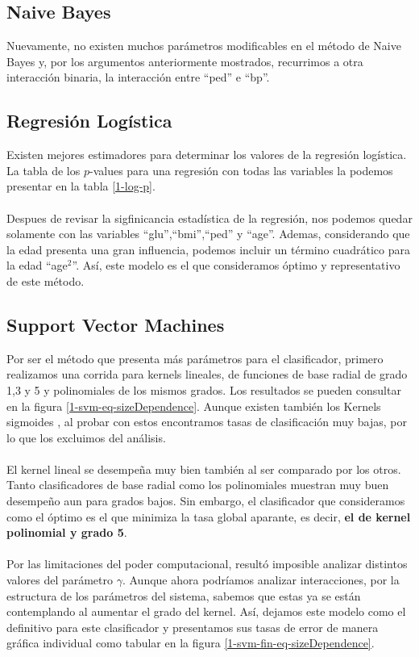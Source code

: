 \documentclass[11pt]{article}
\begin{document}
\subsection{Naive Bayes}
Nuevamente, no existen muchos parámetros modificables en el método de Naive Bayes y, por los argumentos anteriormente mostrados, recurrimos a otra interacción binaria, la interacción entre ``ped'' e ``bp''.
\subsection{Regresión Logística}
Existen mejores estimadores para determinar los valores de la regresión logística. La tabla de los $p$-values para una regresión con todas las variables la podemos presentar en la tabla \ref{1-log-p}.
\\
\\
Despues de revisar la sigfinicancia estadística de la regresión, nos podemos quedar solamente con las variables ``glu'',``bmi'',``ped'' y ``age''. Ademas, considerando que la edad presenta una gran influencia, podemos incluir un término cuadrático para la edad ``age$^2$''. Así, este modelo es el que consideramos óptimo y representativo de este método.
\subsection{Support Vector Machines}
Por ser el método que presenta más parámetros para el clasificador, primero realizamos una corrida para kernels lineales, de funciones de base radial de grado 1,3 y 5 y polinomiales de los mismos grados. Los resultados se pueden consultar en la figura \ref{1-svm-eq-sizeDependence}. Aunque existen también los Kernels sigmoides \cite{sklearn-svc}, al probar con estos encontramos tasas de clasificación muy bajas, por lo que los excluimos del análisis.
\\
\\El kernel lineal se desempeña muy bien también al ser comparado por los otros. Tanto clasificadores de base radial como los polinomiales muestran muy buen desempeño aun para grados bajos. Sin embargo, el clasificador que consideramos como el óptimo es el que minimiza la tasa global aparante, es decir, \textbf{el de kernel polinomial y grado 5}.
\\
\\Por las limitaciones del poder computacional, resultó imposible analizar distintos valores del parámetro $\gamma$. Aunque ahora podríamos analizar interacciones, por la estructura de los parámetros del sistema, sabemos que estas ya se están contemplando al aumentar el grado del kernel. Así, dejamos este modelo como el definitivo para este clasificador y presentamos sus tasas de error de manera gráfica individual como tabular en la figura \ref{1-svm-fin-eq-sizeDependence}.
\end{document}
